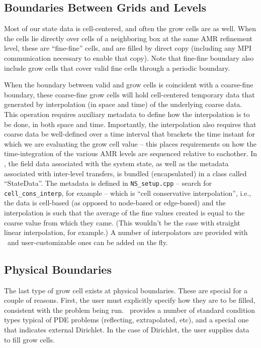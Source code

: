 \subsection{Boundaries Between Grids and Levels}
Most of our state data is cell-centered, and often the grow cells are
as well.  When the cells lie directly over cells of a neighboring box
at the same AMR refinement level, these are ``fine-fine'' cells, and are
filled by direct copy (including any MPI communication necessary to enable
that copy).  Note that fine-fine boundary also include grow cells that
cover valid fine cells through a periodic boundary.

When the boundary between valid and grow cells is coincident
with a coarse-fine boundary, these coarse-fine grow cells will hold cell-centered 
temporary data that generated by interpolation (in space and time) of the
underlying coarse data.  This operation requires auxiliary metadata to define 
how the interpolation is to be done, in both space and time.  Importantly,
the interpolation also requires that coarse data be well-defined over
a time interval that brackets the time instant for which we are evaluating
the grow cell value  -- this places requirements on how the time-integration 
of the various AMR levels are sequenced relative to eachother.
In \amrex, the field data associated with the system state, as well as the metadata
associated with inter-level transfers, is bundled (encapsulated) in
a class called ``StateData''.  The metadata 
is defined in {\tt NS\_setup.cpp} -- search for
{\tt cell\_cons\_interp}, for example -- which is ``cell conservative
interpolation'', i.e., the data is cell-based (as opposed to node-based
or edge-based) and the interpolation is such that the average of the
fine values created is equal to the coarse value from which they came.
(This wouldn't be the case with straight linear interpolation, for
example.)  A number of interpolators are provided with \amrex\ and 
user-customizable ones can be added on the fly.

\subsection{Physical Boundaries}
\label{sec:physicalBCs}
The last type of grow cell exists at physical boundaries.  These are special for 
a couple of reasons.  First, the user must explicitly specify how they are to be
filled, consistent with the problem being run.  \amrex\ provides a number of 
standard condition types typical of PDE problems (reflecting, extrapolated, etc),
and a special one that indicates external Dirichlet. In the case of Dirichlet,
the user supplies data to fill grow cells.

